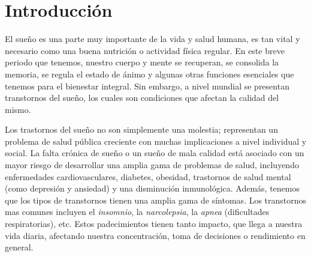 \documentclass{replab}
\title{}
\author{Zahid Medrano Flores}
\subtitle={Análisis del Transtorno del Sueño}
\begin{document}
	
	\pagestyle{fancy}
	\unspacedoperators
	
	


\bigskip
	
\section{Introducción}

El sueño es una parte muy importante de la vida y salud humana, es tan vital y necesario como una buena nutrición o actividad física regular. En este breve periodo que tenemos, nuestro cuerpo y mente se recuperan, se consolida la memoria, se regula el estado de ánimo y algunas otras funciones esenciales que tenemos para el bienestar integral. Sin embargo, a nivel mundial se presentan transtornos del sueño, los cuales son condiciones que afectan la calidad del mismo.

Los trastornos del sueño no son simplemente una molestia; representan un problema de salud pública creciente con muchas implicaciones a nivel individual y social. La falta crónica de sueño o un sueño de mala calidad está asociado con un mayor riesgo de desarrollar una amplia gama de problemas de salud, incluyendo enfermedades cardiovasculares, diabetes, obesidad, trastornos de salud mental (como depresión y ansiedad) y una disminución inmunológica. Además, tenemos que los tipos de transtornos tienen una amplia gama de síntomas. Los transtornos mas comunes incluyen el \textit{insomnio}, la \textit{narcolepsia}, la \textit{apnea} (dificultades respiratorias), etc.  Estos padecimientos tienen tanto impacto, que llega a nuestra vida diaria, afectando nuestra concentración, toma de decisiones o rendimiento en general.
\end{document}
